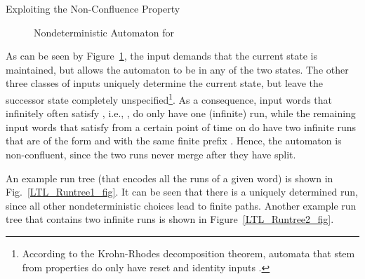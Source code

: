 \documentclass[copyright,creativecommons]{eptcs}
\begin{document}
\begin{section}{Exploiting the Non-Confluence Property}
\begin{figure}
\caption{Nondeterministic Automaton for }
\label{fig:LTLtranslate1}
\end{figure}

As can be seen by Figure~\ref{fig:LTLtranslate1}, the input  demands that the current state is maintained, but allows the automaton to be in any of the two states. The other three classes of inputs uniquely determine the current state, but leave the successor state completely unspecified\footnote{According to the Krohn-Rhodes decomposition theorem, automata that stem from  properties do only have reset and identity inputs \cite{Schn03}.}. As a consequence, input words that infinitely often satisfy , i.e., , do only have one (infinite) run, while the remaining input words that satisfy  from a certain point of time on do have two infinite runs that are of the form  and  with the same finite prefix . Hence, the automaton is non-confluent, since the
two runs never merge after they have split.

An example run tree (that encodes all the runs of a given word) is shown in Fig.~\ref{LTL_Runtree1_fig}. It can be seen that there is a uniquely determined run, since all other nondeterministic choices lead to finite paths. Another example run tree that contains two infinite runs is shown in Figure~\ref{LTL_Runtree2_fig}.

\begin{figure}
\centering
{}
\end{figure}
\end{section}
\end{document}
